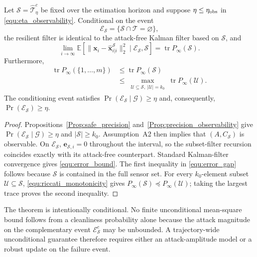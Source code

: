 \begin{theorem}
\label{Thm:resilient_estimation_gaurentee}
Let $\mathcal S=\hat{\mathcal{T}}_\eta^c$ be fixed over the estimation horizon and suppose $\eta\le\eta_{\rm obs}$ in \eqref{equ:eta_observability}. Conditional on the event
\[
\mathcal{E}_{\mathcal S}=\{\mathcal S\cap\mathcal{T}=\varnothing\},
\]
the resilient filter is identical to the attack-free Kalman filter based on $\mathcal S$, and
\begin{equation}\label{equ:error_bound}
\lim_{i\rightarrow\infty}
\mathbb{E}\!\left[
\|\mathbf{x}_i-\hat{\mathbf{x}}_{i|i}^{\mathcal S}\|_2^2
\mid\mathcal{E}_{\mathcal S},\mathcal S
\right]
=\operatorname{tr}P_\infty(\mathcal S).
\end{equation}
Furthermore,
\begin{align}\label{equ:error_gap}
\operatorname{tr}P_\infty(\{1,\ldots,m\})
&\le\operatorname{tr}P_\infty(\mathcal S)\nonumber\\
&\le
\max_{\substack{\mathcal U\subseteq\mathcal S,\ |\mathcal U|=k_0}}
\operatorname{tr}P_\infty(\mathcal U).
\end{align}
The conditioning event satisfies
$\Pr(\mathcal{E}_{\mathcal S}\mid\mathcal G)\ge\eta$ and, consequently,
$\Pr(\mathcal{E}_{\mathcal S})\ge\eta$.
\end{theorem}
\begin{proof}
Propositions~\ref{Prop:safe_precision} and~\ref{Prop:precision_observability} give $\Pr(\mathcal{E}_{\mathcal S}\mid\mathcal G)\ge\eta$ and $|\mathcal S|\ge k_0$. Assumption~A2 then implies that $(A,C_{\mathcal S})$ is observable. On $\mathcal{E}_{\mathcal S}$, $\mathbf{e}_{\mathcal S,i}=0$ throughout the interval, so the subset-filter recursion coincides exactly with its attack-free counterpart. Standard Kalman-filter convergence gives \eqref{equ:error_bound}. The first inequality in \eqref{equ:error_gap} follows because $\mathcal S$ is contained in the full sensor set. For every $k_0$-element subset $\mathcal U\subseteq\mathcal S$, \eqref{equ:riccati_monotonicity} gives $P_\infty(\mathcal S)\preceq P_\infty(\mathcal U)$; taking the largest trace proves the second inequality.
\end{proof}

The theorem is intentionally conditional. No finite unconditional mean-square bound follows from a cleanliness probability alone because the attack magnitude on the complementary event $\mathcal{E}_{\mathcal S}^c$ may be unbounded. A trajectory-wide unconditional guarantee therefore requires either an attack-amplitude model or a robust update on the failure event.

